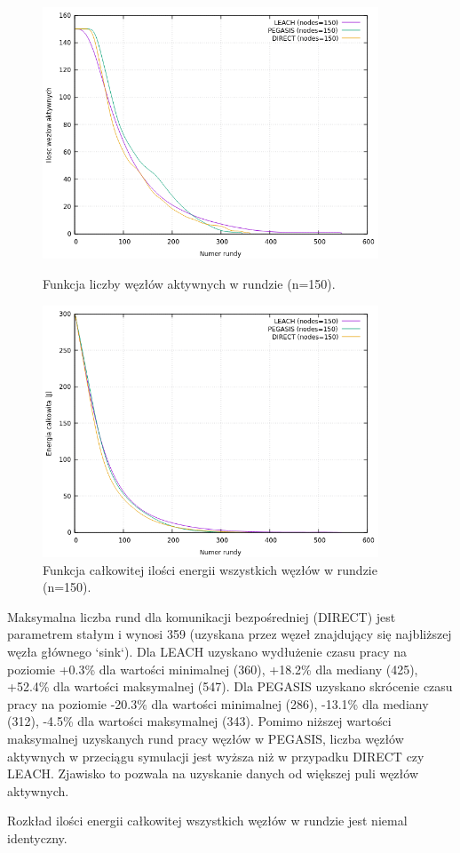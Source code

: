 \documentclass[a4paper,12pt,twoside,openany]{report}
\begin{document}
\begin{figure}[H]
 \centering
 \includegraphics[width=10cm]{images/gnuplot/test_2/nodes_in_round_150.png}
 \caption{Funkcja liczby węzłów aktywnych w rundzie (n=150).}
 \includegraphics[width=10cm]{images/gnuplot/test_2/energy_in_round_150.png}
 \caption{Funkcja całkowitej ilości energii wszystkich węzłów w rundzie (n=150).}
\end{figure}

\par
Maksymalna liczba rund dla komunikacji bezpośredniej (DIRECT) jest parametrem stałym i wynosi 359 (uzyskana przez węzeł znajdujący się najbliższej węzła głównego `sink`).
Dla LEACH uzyskano wydłużenie czasu pracy na poziomie +0.3\% dla wartości minimalnej (360), +18.2\% dla mediany (425), +52.4\% dla wartości maksymalnej (547).
Dla PEGASIS uzyskano skrócenie czasu pracy na poziomie -20.3\% dla wartości minimalnej (286), -13.1\% dla mediany (312), -4.5\% dla wartości maksymalnej (343).
Pomimo niższej wartości maksymalnej uzyskanych rund pracy węzłów w PEGASIS, liczba węzłów aktywnych w przeciągu symulacji jest wyższa niż w przypadku DIRECT czy LEACH.
Zjawisko to pozwala na uzyskanie danych od większej puli węzłów aktywnych.
\par
Rozkład ilości energii całkowitej wszystkich węzłów w rundzie jest niemal identyczny.
\end{document}

